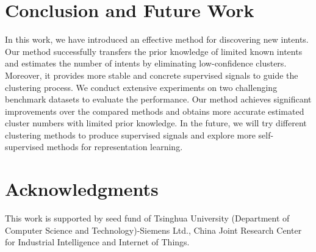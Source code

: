 \documentclass[letterpaper]{article} \usepackage{aaai21}  \usepackage{times}  \usepackage{helvet} \usepackage{courier}  \usepackage[hyphens]{url}  \usepackage{graphicx} \urlstyle{rm} \def\UrlFont{\rm}  \usepackage{natbib}  \usepackage{caption} \frenchspacing  \setlength{\pdfpagewidth}{8.5in}  \setlength{\pdfpageheight}{11in}  \usepackage{amsmath}
\begin{document}
	\section{Conclusion and Future Work}
	In this work, we have introduced an effective method for discovering new intents. Our method successfully transfers the prior knowledge of limited known intents and estimates the number of intents by eliminating low-confidence clusters. Moreover, it provides more stable and concrete supervised signals to guide the clustering process. We conduct extensive experiments on two challenging benchmark datasets to evaluate the performance. Our method achieves significant improvements over the compared methods and obtains more accurate estimated cluster numbers with limited prior knowledge. In the future, we will try different clustering methods to produce supervised signals and explore more self-supervised methods for representation learning.
	
	
	\section{Acknowledgments}
	This work is supported by seed fund of Tsinghua University (Department of Computer Science and Technology)-Siemens Ltd., China Joint Research Center for Industrial Intelligence and Internet of Things. 
	
\end{document}
